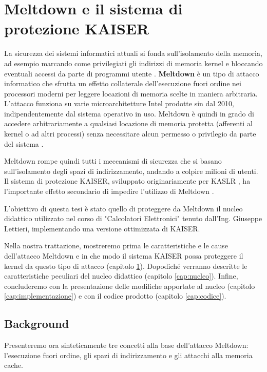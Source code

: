\chapter{Meltdown e il sistema di protezione KAISER}
\label{cap:meltdown}
La sicurezza dei sistemi informatici attuali si fonda sull'isolamento della memoria,
ad esempio marcando come privilegiati gli indirizzi di memoria kernel e bloccando eventuali
accessi da parte di programmi utente \cite{lettieri:protezione}. 
\textbf{Meltdown} è un tipo di attacco informatico che sfrutta un effetto
collaterale dell'esecuzione fuori ordine nei processori moderni per leggere locazioni di memoria scelte in maniera
arbitraria. L'attacco funziona su varie microarchitetture Intel prodotte sin dal 2010, indipendentemente dal sistema
operativo in uso. Meltdown è quindi in grado di accedere arbitrariamente a qualsiasi locazione di memoria protetta
(afferenti al kernel o ad altri processi) senza necessitare alcun permesso o privilegio da parte del
sistema \cite{lipp:meltdown}.

Meltdown rompe quindi tutti i meccanismi di sicurezza che si basano sull'isolamento degli spazi di indirizzamento, andando a colpire milioni di utenti. Il sistema di protezione KAISER, sviluppato originariamente per KASLR \cite{gruss:kaslr}, ha l'importante effetto secondario di impedire l'utilizzo di Meltdown \cite{lipp:meltdown}.

L'obiettivo di questa tesi è stato quello di proteggere da Meltdown il nucleo didattico utilizzato nel corso di "Calcolatori Elettronici" tenuto dall'Ing. Giuseppe Lettieri, implementando una versione ottimizzata di KAISER.

Nella nostra trattazione, mostreremo prima le caratteristiche e le cause dell'attacco Meltdown e in che modo il sistema KAISER possa proteggere il kernel da questo tipo di attacco (capitolo \ref{cap:meltdown}).
Dopodiché verranno descritte le caratteristiche peculiari del nucleo didattico (capitolo \vref{cap:nucleo}). 
Infine, concluderemo con la presentazione delle modifiche apportate al nucleo (capitolo \vref{cap:implementazione}) e con il codice prodotto (capitolo \vref{cap:codice}).


\section{Background}
Presenteremo ora sinteticamente tre concetti alla base dell'attacco Meltdown: l'esecuzione fuori ordine, gli spazi di indirizzamento e gli attacchi alla memoria cache.

